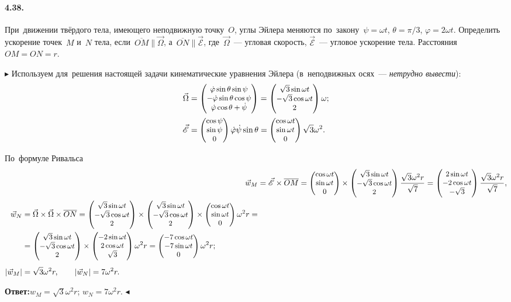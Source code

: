 \documentclass{weekly}
\begin{document}
\paragraph{4.38.} При~движении твёрдого тела, имеющего неподвижную
точку~$O$, углы Эйлера меняются по~закону~$\psi = \omega t$,
$\theta = \pi/3$, $\varphi = 2\omega t$. Определить ускорение
точек~$M$ и~$N$ тела, если~$\overline{OM} \parallel \vec\Omega$,
а~$\overline{ON} \parallel \vec{\mathscr{E}}$,
где~$\vec\Omega$~--- угловая скорость, $\vec{\mathscr{E}}$~--- угловое
ускорение тела. Расстояния $OM = ON = r$.

$\blacktriangleright$
Используем для~решения настоящей задачи кинематические уравнения Эйлера
(в~неподвижных осях~--- \emph{нетрудно вывести}):
\begin{align}
    \vec\Omega &= \small\begin{pmatrix}\dot\varphi\sin\theta\sin\psi\\-\dot\varphi\sin\theta\cos\psi\\\dot\varphi\cos\theta + \dot\psi\end{pmatrix}
        = \small\begin{pmatrix}\sqrt{3}\sin\omega t\\-\sqrt{3}\cos\omega t\\2\end{pmatrix} \omega; \\
    \vec{\mathscr{E}} &= \small\begin{pmatrix}\cos\psi\\\sin\psi\\0\end{pmatrix}
            \dot\varphi\dot\psi\sin\theta
        = \small\begin{pmatrix}\cos\omega t\\\sin\omega t\\0\end{pmatrix}
            \sqrt{3}\omega^2.
\end{align}

По~формуле Ривальса
\begin{align}
    \vec w_M &= \vec{\mathscr{E}} \times \overline{OM}
        = \small\begin{pmatrix}\cos\omega t\\\sin\omega t\\0\end{pmatrix} \times
            \small\begin{pmatrix}\sqrt{3}\sin\omega t\\-\sqrt{3}\cos\omega t\\2\end{pmatrix}
            \frac{\sqrt{3} \omega^2 r}{\sqrt{7}}
        = \small\begin{pmatrix}2\sin\omega t\\-2\cos\omega t\\-\sqrt{3}\end{pmatrix}
            \frac{\sqrt{3} \omega^2 r}{\sqrt{7}}, \\
\begin{split}
    \vec w_N &= \vec\Omega \times \vec\Omega \times \overline{ON}
        = \small\begin{pmatrix}\sqrt{3}\sin\omega t\\-\sqrt{3}\cos\omega t\\2\end{pmatrix} \times
            \small\begin{pmatrix}\sqrt{3}\sin\omega t\\-\sqrt{3}\cos\omega t\\2\end{pmatrix} \times
            \small\begin{pmatrix}\cos\omega t\\\sin\omega t\\0\end{pmatrix} \omega^2 r =\\
        &= \small\begin{pmatrix}\sqrt{3}\sin\omega t\\-\sqrt{3}\cos\omega t\\2\end{pmatrix} \times
            \small\begin{pmatrix}-2\sin\omega t\\2\cos\omega t\\\sqrt{3}\end{pmatrix} \omega^2 r
        = \small\begin{pmatrix}-7\cos\omega t\\-7\sin\omega t\\0\end{pmatrix} \omega^2 r; \\[1ex]
    \left| \vec w_M \right| &= \sqrt{3}\omega^2 r, \qquad
    \left| \vec w_N \right| = 7\omega^2 r.
\end{split}
\end{align}

\textbf{Ответ:}\quad $w_M = \sqrt{3}\omega^2 r$;\qquad
$w_N = 7\omega^2 r$. \hfill $\blacktriangleleft$
\end{document}
